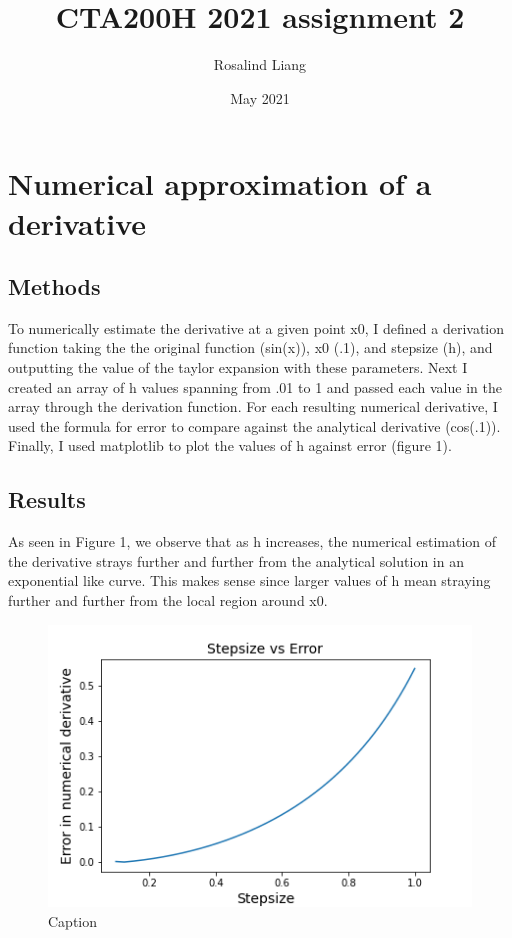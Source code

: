 \documentclass{article}
\title{CTA200H 2021 assignment 2}
\author{Rosalind Liang }
\date{May 2021}
\begin{document}
\maketitle

\section{Numerical approximation of a derivative}
\subsection{Methods}
To numerically estimate the derivative at a given point x0, I defined a derivation function taking the the original function (sin(x)), x0 (.1), and stepsize (h), and outputting the value of the taylor expansion with these parameters. Next I created an array of h values spanning from .01 to 1 and passed each value in the array through the derivation function. For each resulting numerical derivative, I used the formula for error to compare against the analytical derivative (cos(.1)). Finally, I used matplotlib to plot the values of h against error (figure 1).

\subsection{Results}
As seen in Figure 1, we observe that as h increases, the numerical estimation of the derivative strays further and further from the analytical solution in an exponential like curve. This makes sense since larger values of h mean straying further and further from the local region around x0.

\begin{figure}[H]
    \centering
    \includegraphics[width=4.5in]{fig1.png}
    \caption{Caption}
\end{figure}
\end{document}
